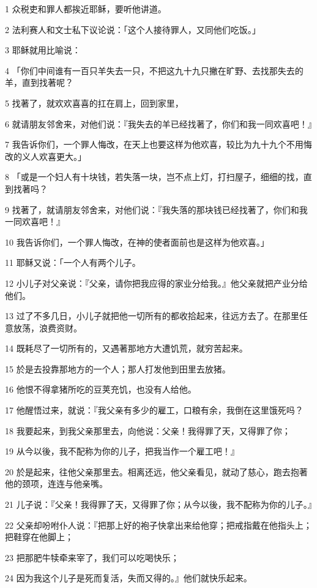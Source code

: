 \par 1 众税吏和罪人都挨近耶稣，要听他讲道。
\par 2 法利赛人和文士私下议论说：「这个人接待罪人，又同他们吃饭。」
\par 3 耶稣就用比喻说：
\par 4 「你们中间谁有一百只羊失去一只，不把这九十九只撇在旷野、去找那失去的羊，直到找著呢？
\par 5 找著了，就欢欢喜喜的扛在肩上，回到家里，
\par 6 就请朋友邻舍来，对他们说：『我失去的羊已经找著了，你们和我一同欢喜吧！』
\par 7 我告诉你们，一个罪人悔改，在天上也要这样为他欢喜，较比为九十九个不用悔改的义人欢喜更大。」
\par 8 「或是一个妇人有十块钱，若失落一块，岂不点上灯，打扫屋子，细细的找，直到找著吗？
\par 9 找著了，就请朋友邻舍来，对他们说：『我失落的那块钱已经找著了，你们和我一同欢喜吧！』
\par 10 我告诉你们，一个罪人悔改，在神的使者面前也是这样为他欢喜。」
\par 11 耶稣又说：「一个人有两个儿子。
\par 12 小儿子对父亲说：『父亲，请你把我应得的家业分给我。』他父亲就把产业分给他们。
\par 13 过了不多几日，小儿子就把他一切所有的都收拾起来，往远方去了。在那里任意放荡，浪费资财。
\par 14 既耗尽了一切所有的，又遇著那地方大遭饥荒，就穷苦起来。
\par 15 於是去投靠那地方的一个人；那人打发他到田里去放猪。
\par 16 他恨不得拿猪所吃的豆荚充饥，也没有人给他。
\par 17 他醒悟过来，就说：『我父亲有多少的雇工，口粮有余，我倒在这里饿死吗？
\par 18 我要起来，到我父亲那里去，向他说：父亲！我得罪了天，又得罪了你；
\par 19 从今以後，我不配称为你的儿子，把我当作一个雇工吧！』
\par 20 於是起来，往他父亲那里去。相离还远，他父亲看见，就动了慈心，跑去抱著他的颈项，连连与他亲嘴。
\par 21 儿子说：『父亲！我得罪了天，又得罪了你；从今以後，我不配称为你的儿子。』
\par 22 父亲却吩咐仆人说：『把那上好的袍子快拿出来给他穿；把戒指戴在他指头上；把鞋穿在他脚上；
\par 23 把那肥牛犊牵来宰了，我们可以吃喝快乐；
\par 24 因为我这个儿子是死而复活，失而又得的。』他们就快乐起来。
